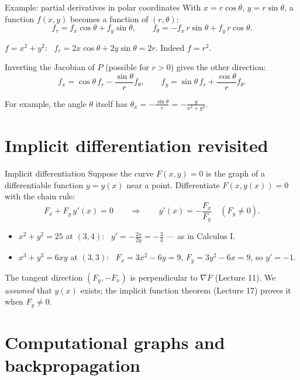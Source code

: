 \documentclass[10pt]{wosm-slides}
\begin{document}
\begin{frame}{Example: partial derivatives in polar coordinates}
  With $x = r\cos\theta$, $y = r\sin\theta$, a function $f(x, y)$ becomes a function of $(r, \theta)$:
  \[ f_r = f_x \cos\theta + f_y \sin\theta, \qquad f_\theta = -f_x\, r\sin\theta + f_y\, r\cos\theta . \]
  \pause
  \begin{example}
    $f = x^2 + y^2$: \ $f_r = 2x\cos\theta + 2y\sin\theta = 2r$. Indeed $f = r^2$.
  \end{example}
  \pause
  Inverting the Jacobian of $P$ (possible for $r > 0$) gives the other direction:
  \[ f_x = \cos\theta\, f_r - \frac{\sin\theta}{r} f_\theta, \qquad
     f_y = \sin\theta\, f_r + \frac{\cos\theta}{r} f_\theta . \]
  {\small For example, the angle $\theta$ itself has $\theta_x = -\frac{\sin\theta}{r} = -\frac{y}{x^2 + y^2}$.\par}
\end{frame}

\section{Implicit differentiation revisited}

\begin{frame}{Implicit differentiation}
  Suppose the curve $F(x, y) = 0$ is the graph of a differentiable function $y = y(x)$ near a point.
  \pause
  Differentiate $F(x, y(x)) = 0$ with the chain rule:
  \[ F_x + F_y\, y'(x) = 0 \qquad\Longrightarrow\qquad y'(x) = -\frac{F_x}{F_y} \quad (F_y \ne 0) . \]
  \pause
  \begin{example}
    \begin{itemize}
      \item $x^2 + y^2 = 25$ at $(3, 4)$: \ $y' = -\frac{2x}{2y} = -\frac34$ --- as in Calculus I.
      \item $x^3 + y^3 = 6xy$ at $(3, 3)$: \ $F_x = 3x^2 - 6y = 9$, $F_y = 3y^2 - 6x = 9$, so $y' = -1$.
    \end{itemize}
  \end{example}
  \pause
  {\small The tangent direction $(F_y, -F_x)$ is perpendicular to $\nabla F$ (Lecture 11). We
  \emph{assumed} that $y(x)$ exists; the implicit function theorem (Lecture 17) proves it when $F_y \ne 0$.\par}
\end{frame}

\section{Computational graphs and backpropagation}
\end{document}
